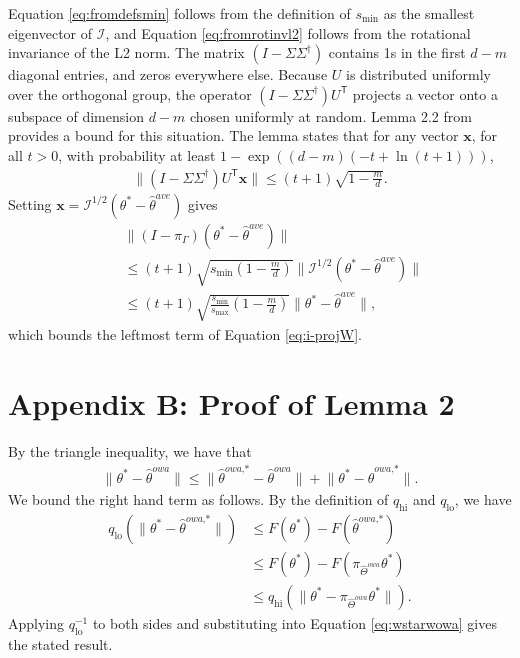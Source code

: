 \documentclass[twoside]{article}
\newcommand{\smin}{s_\text{min}}
\newcommand{\smax}{s_\text{max}}
\newcommand{\qhi}{q_\text{hi}}
\newcommand{\qlo}{q_\text{lo}}
\newcommand{\W}{{\hat \Theta^{\textit{owa}}}}
\newcommand{\x}{\mathbf{x}}
\newcommand{\w}{\theta}
\newcommand{\wowa}{\hat\w^{owa}}
\newcommand{\wowastar}{\hat\w^{\textit{owa,*}}}
\newcommand{\wave}{\hat\w^{ave}}
\newcommand{\wstar}{{\w^{*}}}
\newcommand{\I}{\mathcal I}
\newcommand{\trans}[1]{\ensuremath{{#1}^{\mathsf{T}}}}
\newcommand{\pinv}[1]{\ensuremath{{#1}^{\mathsf{\dagger}}}}
\newcommand{\ltwo}[1]{{\lVert {#1} \rVert}}
\newcommand{\proj}[1]{\pi_{{#1}}}
\begin{document}
Equation \ref{eq:fromdefsmin} follows from the definition of $\smin$ as the smallest eigenvector of $\I$,
and Equation \ref{eq:fromrotinvl2} follows from the rotational invariance of the L2 norm.
The matrix $(I-\Sigma\pinv\Sigma)$ contains 1s in the first $d-m$ diagonal entries, and zeros everywhere else.
Because $U$ is distributed uniformly over the orthogonal group,
the operator $(I-\Sigma\pinv\Sigma)\trans U$ projects a vector onto a subspace of dimension $d-m$ chosen uniformly at random.
Lemma 2.2 from \cite{dasgupta2003elementary} provides a bound for this situation.
The lemma states that for any vector $\x$, for all $t>0$, with probability at least $1-\exp((d-m)(-t+\ln (t+1)))$,
\begin{align}
\ltwo{(I-\Sigma\pinv\Sigma)\trans U \x} \le (t+1) \sqrt{1-\frac{m}{d}}
.
\label{eq:dasgupta}
\end{align}
Setting $\x=\I^{1/2}(\wstar-\wave)$ gives
\begin{align}
~~~~~&\!\!\!\!\!\!\!\!\!\!\!\ltwo{(I-\proj\Gamma)(\wstar-\wave)}
\nonumber
\\
&\le
(t+1)\sqrt{\smin\left(1-\frac{m}{d}\right)}\ltwo{\I^{1/2}(\wstar - \wave)}
\\
&\le
(t+1)\sqrt{\frac{\smin}{\smax}\left(1-\frac{m}{d}\right)}\ltwo{\wstar - \wave}
,
\end{align}
which bounds the leftmost term of Equation \ref{eq:i-projW}.


\section*{Appendix B: Proof of Lemma 2}
By the triangle inequality, we have that
\begin{align}
\ltwo{\wstar-\wowa}
\le
\ltwo{\wowastar-\wowa}
+
\ltwo{\wstar-\wowastar}
.
\label{eq:wstarwowa}
\end{align}
We bound the right hand term as follows.
By the definition of $\qhi$ and $\qlo$, we have
\begin{align}
\qlo \left( \ltwo {\wstar-\wowastar} \right)
&\le F(\wstar) - F(\wowastar)
\\
&\le F(\wstar) - F(\proj\W\wstar)
\\
&\le \qhi \left( \ltwo {\wstar - \proj\W\wstar} \right)
.
\end{align}
Applying $\qlo^{-1}$ to both sides and substituting into Equation \ref{eq:wstarwowa} gives the stated result.
\end{document}

